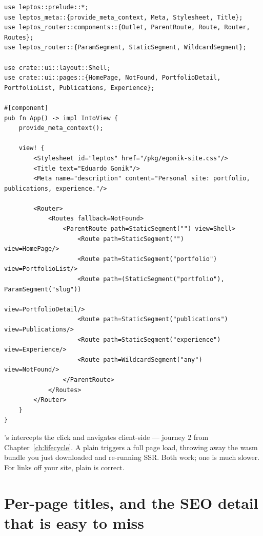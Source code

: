 \begin{lstlisting}[style=rs,caption={\file{src/app.rs} --- the whole file, and it should stay roughly this size.}]
use leptos::prelude::*;
use leptos_meta::{provide_meta_context, Meta, Stylesheet, Title};
use leptos_router::components::{Outlet, ParentRoute, Route, Router, Routes};
use leptos_router::{ParamSegment, StaticSegment, WildcardSegment};

use crate::ui::layout::Shell;
use crate::ui::pages::{HomePage, NotFound, PortfolioDetail, PortfolioList, Publications, Experience};

#[component]
pub fn App() -> impl IntoView {
    provide_meta_context();

    view! {
        <Stylesheet id="leptos" href="/pkg/egonik-site.css"/>
        <Title text="Eduardo Gonik"/>
        <Meta name="description" content="Personal site: portfolio, publications, experience."/>

        <Router>
            <Routes fallback=NotFound>
                <ParentRoute path=StaticSegment("") view=Shell>
                    <Route path=StaticSegment("")             view=HomePage/>
                    <Route path=StaticSegment("portfolio")    view=PortfolioList/>
                    <Route path=(StaticSegment("portfolio"), ParamSegment("slug"))
                                                              view=PortfolioDetail/>
                    <Route path=StaticSegment("publications") view=Publications/>
                    <Route path=StaticSegment("experience")   view=Experience/>
                    <Route path=WildcardSegment("any")        view=NotFound/>
                </ParentRoute>
            </Routes>
        </Router>
    }
}
\end{lstlisting}

\begin{pitfall}
's  intercepts the click and navigates
client-side --- journey 2 from Chapter~\ref{ch:lifecycle}. A plain 
triggers a full page load, throwing away the wasm bundle you just downloaded and re-running SSR.
Both work; one is much slower. For links off your site, plain  is correct.
\end{pitfall}

\section{Per-page titles, and the SEO detail that is easy to miss}

